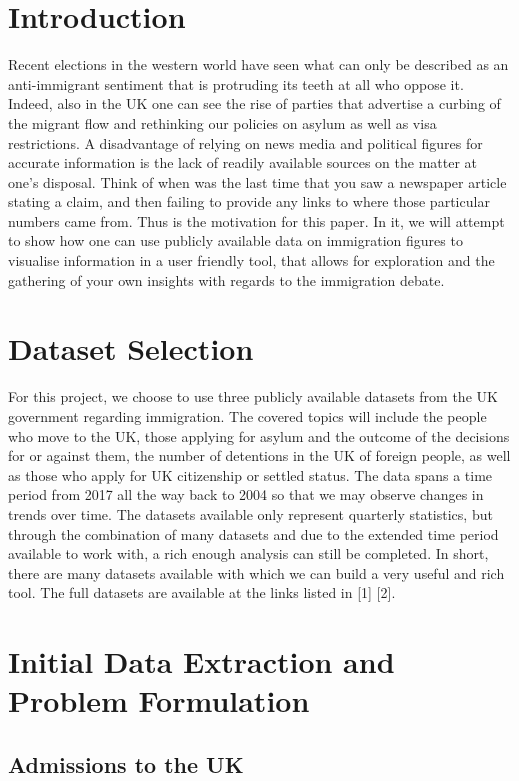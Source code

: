 \documentclass[11pt,a4paper,titlepage]{article}
\begin{document}
\setcounter{page}{1}

\section{Introduction}
Recent elections in the western world have seen what can only be described as an anti-immigrant sentiment that is protruding its teeth at all who oppose it. Indeed, also in the UK one can see the rise of parties that advertise a curbing of the migrant flow and rethinking our policies on asylum as well as visa restrictions. A disadvantage of relying on news media and political figures for accurate information is the lack of readily available sources on the matter at one's disposal. Think of when was the last time that you saw a newspaper article stating a claim, and then failing to provide any links to where those particular numbers came from. Thus is the motivation for this paper. In it, we will attempt to show how one can use publicly available data on immigration figures to visualise information in a user friendly tool, that allows for exploration and the gathering of your own insights with regards to the immigration debate.

\section{Dataset Selection}
For this project, we choose to use three publicly available datasets from the UK government regarding immigration. The covered topics will include the people who move to the UK, those applying for asylum and the outcome of the decisions for or against them, the number of detentions in the UK of foreign people, as well as those who apply for UK citizenship or settled status. The data spans a time period from 2017 all the way back to 2004 so that we may observe changes in trends over time. The datasets available only represent quarterly statistics, but through the combination of many datasets and due to the extended time period available to work with, a rich enough analysis can still be completed. In short, there are many datasets available with which we can build a very useful and rich tool. The full datasets are available at the links listed in [1] [2].

\section{Initial Data Extraction and Problem Formulation}
\subsection{Admissions to the UK}
\end{document}
